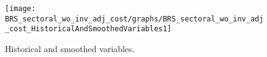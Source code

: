  
\begin{figure}[H]
\centering 
\texttt{[image: BRS\_sectoral\_wo\_inv\_adj\_cost/graphs/BRS\_sectoral\_wo\_inv\_adj\_cost\_HistoricalAndSmoothedVariables1]}
\caption{Historical and smoothed variables.}\label{Fig:HistoricalAndSmoothedVariables:1}
\end{figure}



